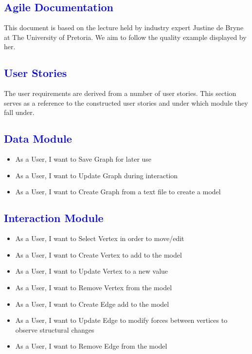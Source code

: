 \documentclass[12pt]{article}
\begin{document}
\newpage
{}
\thispagestyle{empty}
\tableofcontents
\clearpage

\textcolor{blue}{\section{Agile Documentation}}
\begin{flushleft}
	This document is based on the lecture held by industry expert Justine de Bryne at The University of Pretoria. We aim to follow the quality example displayed by her.
\end{flushleft}

\textcolor{blue}{\section{User Stories}}
\begin{flushleft}
	The user requirements are derived from a number of user stories. This section serves as a reference to the constructed user stories and under which module they fall under.	
	
	\textcolor{blue}{\subsection{Data Module}}	
	\begin{flushleft}
	\begin{itemize}
	\item As a User, I want to Save Graph for later use
	\item As a User, I want to Update Graph during interaction
	\item As a User, I want to Create Graph from a text file to create a model
	\end{itemize}	
	\end{flushleft}
	
	\textcolor{blue}{\subsection{Interaction Module}}	
	\begin{flushleft}
	\begin{itemize}
	\item As a User, I want to Select Vertex in order to move/edit
	\item As a User, I want to Create Vertex to add to the model
	\item As a User, I want to Update Vertex to a new value
	\item As a User, I want to Remove Vertex from the model
	\item As a User, I want to Create Edge add to the model
	\item As a User, I want to Update Edge to modify forces between vertices to observe structural changes
	\item As a User, I want to Remove Edge from the model
	\end{itemize}	
	\end{flushleft}
	

\end{flushleft}
\end{document}
